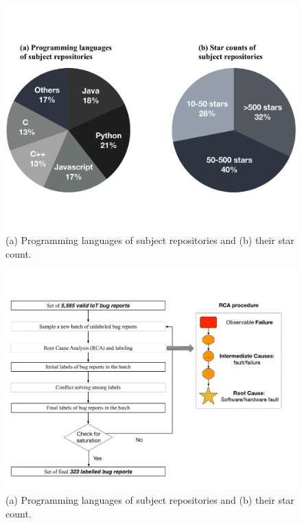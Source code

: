  \begin{figure}
  \centering
   \includegraphics[width=\linewidth]{imgs/repodemog}
  \caption{(a) Programming languages of subject repositories and (b) their star count.}
  \label{fig:repodemog}
\end{figure}


 \begin{figure}
  \centering
   \includegraphics[width=\linewidth]{imgs/labeling}
  \caption{(a) Programming languages of subject repositories and (b) their star count.}
  \label{fig:labeling}
\end{figure}

